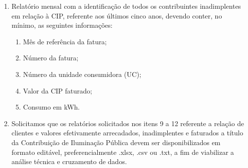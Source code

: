 \begin{enumerate}[resume]
\item Relatório mensal com a identificação de todos os contribuintes inadimplentes em relação à CIP, referente aos últimos cinco anos, devendo conter, no mínimo, as seguintes informações:
\begin{enumerate}[resume]
  \item Mês de referência da fatura;
  \item Número da fatura;
  \item Número da unidade consumidora (UC);
  \item Valor da CIP faturado;
  \item Consumo em kWh.
\end{enumerate}

\item Solicitamos que os relatórios solicitados nos itens 9 a 12 referente a relação de clientes e valores efetivamente arrecadados, inadimplentes e faturados a título da Contribuição de Iluminação Pública devem ser disponibilizados em formato editável, preferencialmente .xlsx, .csv ou .txt, a fim de viabilizar a análise técnica e cruzamento de dados.
\end{enumerate}


